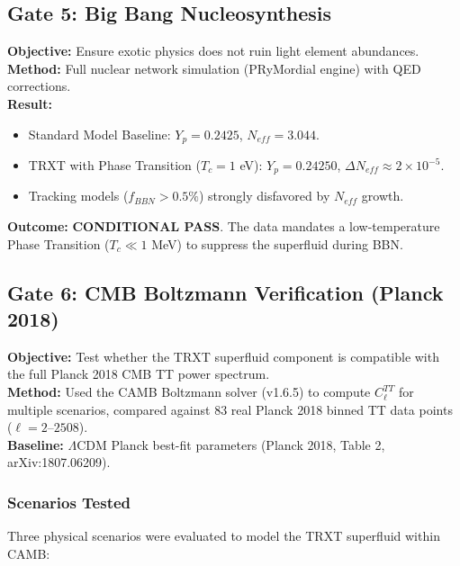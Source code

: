 \documentclass[a4paper,12pt]{article}
\begin{document}
\subsection{Gate 5: Big Bang Nucleosynthesis}
\textbf{Objective:} Ensure exotic physics does not ruin light element abundances.\\
\textbf{Method:} Full nuclear network simulation (PRyMordial engine) with QED corrections.\\
\textbf{Result:}
\begin{itemize}
    \item Standard Model Baseline: $Y_p = 0.2425$, $N_{eff} = 3.044$.
    \item TRXT with Phase Transition ($T_c = 1$ eV): $Y_p = 0.24250$, $\Delta N_{eff} \approx 2 \times 10^{-5}$.
    \item Tracking models ($f_{BBN} > 0.5\%$) strongly disfavored by $N_{eff}$ growth.
\end{itemize}
\textbf{Outcome:} \textbf{CONDITIONAL PASS}. The data mandates a low-temperature Phase Transition ($T_c \ll 1$ MeV) to suppress the superfluid during BBN.

\subsection{Gate 6: CMB Boltzmann Verification (Planck 2018)}

\textbf{Objective:} Test whether the TRXT superfluid component is compatible with the full Planck 2018 CMB TT power spectrum.\\
\textbf{Method:} Used the CAMB Boltzmann solver (v1.6.5) to compute $C_\ell^{TT}$ for multiple scenarios, compared against 83 real Planck 2018 binned TT data points ($\ell = 2$--$2508$).\\
\textbf{Baseline:} $\Lambda$CDM Planck best-fit parameters (Planck 2018, Table 2, arXiv:1807.06209).

\subsubsection{Scenarios Tested}
Three physical scenarios were evaluated to model the TRXT superfluid within CAMB:
\end{document}

